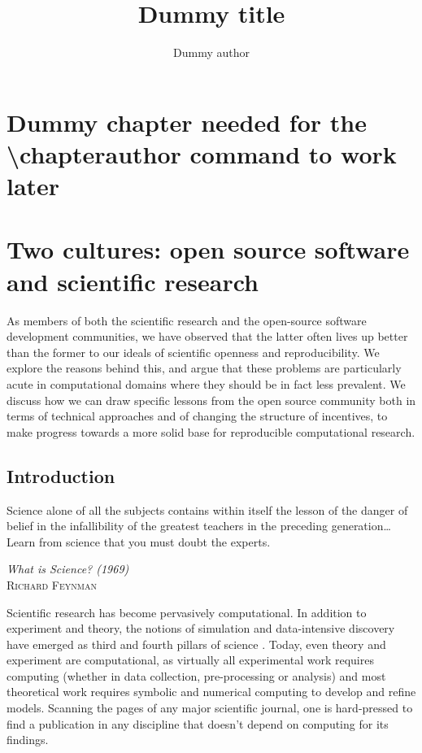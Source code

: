 \documentclass[ChapterTOCs,krantz2]{krantz} %
\begin{document}
\title{Dummy title}
\author{Dummy author}
\chapter*{Dummy chapter needed for the \textbackslash chapterauthor command to work later}

\mainmatter



\chapter{Two cultures: open source software and scientific research}

As members of both the scientific research and the open-source
software development communities, we have observed that the latter
often lives up better than the former to our ideals of scientific
openness and reproducibility.  We explore the reasons behind this,
and argue that these problems are particularly acute in computational
domains where they should be in fact less prevalent.   We discuss
how we can draw specific lessons from the open source community both
in terms of technical approaches and of changing the structure of
incentives, to make progress towards a more solid base for reproducible
computational research.

\section{Introduction}\label{intro}

\setlength{\epigraphrule}{0pt}
\setlength{\epigraphwidth}{.65\textwidth}
\epigraph%
{%
  Science alone of all the subjects contains within itself the lesson of the
  danger of belief in the infallibility of the greatest teachers in the
  preceding generation\ldots Learn from science that you must doubt the experts.
}%
{\textit{What is Science? (1969)}\\ \textsc{Richard Feynman} }

Scientific research has become pervasively computational. In addition
to experiment and theory, the notions of simulation and data-intensive
discovery have emerged as third and fourth pillars of science \cite{4th-paradigm}.
Today, even theory and experiment are computational, as virtually
all experimental work requires computing (whether in data collection,
pre-processing or analysis) and most theoretical work requires symbolic
and numerical computing to develop and refine models. Scanning the pages
of any major scientific journal, one is hard-pressed to find a publication
in any discipline that doesn't depend on computing for its findings.
\end{document}
